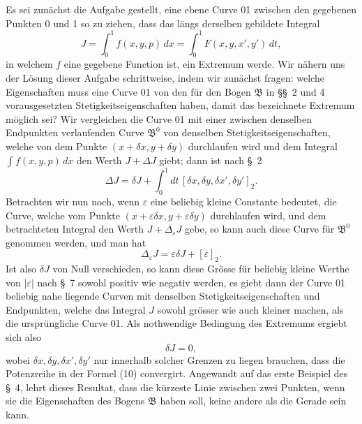 \documentclass[11pt,a4paper,leqno]{article}
\begin{document}
Es sei zunächst die Aufgabe gestellt, eine ebene Curve 01 zwischen den gegebenen Punkten 0 und 1 so zu ziehen, dass das längs derselben gebildete Integral
\[
J=\int_0^1 f(x,y,p)\,dx=\int_0^1 F(x,y,x',y')\,dt,
\]
in welchem $f$ eine gegebene Function ist, ein Extremum werde. Wir nähern uns der Lösung dieser Aufgabe schrittweise, indem wir zunächst fragen: welche Eigenschaften muss eine Curve 01 von den für den Bogen $\mathfrak{B}$ in \S\S~2 und 4 vorausgesetzten Stetigkeitseigenschaften haben, damit das bezeichnete Extremum möglich sei? Wir vergleichen die Curve 01 mit einer zwischen denselben Endpunkten verlaufenden Curve $\mathfrak{B}^0$ von denselben Stetigkeitseigenschaften, welche von dem Punkte $(x+\delta x,y+\delta y)$ durchlaufen wird und dem Integral $\int f(x,y,p)\,dx$ den Werth $J+\Delta J$ giebt; dann ist nach \S~2
\begin{equation}\tag{10}
\Delta J=\delta J+\int_0^1 dt\,[\delta x,\delta y,\delta x',\delta y']_2.
\end{equation}
Betrachten wir nun noch, wenn $\varepsilon$ eine beliebig kleine Constante bedeutet, die Curve, welche vom Punkte $(x+\varepsilon\delta x,y+\varepsilon\delta y)$ durchlaufen wird, und dem betrachteten Integral den Werth $J+\Delta_\varepsilon J$ gebe, so kann auch diese Curve für $\mathfrak{B}^0$ genommen
werden, und man hat
\[
\Delta_\varepsilon J=\varepsilon\delta J+[\varepsilon]_2.
\]
Ist also $\delta J$ von Null verschieden, so kann diese Grösse für beliebig kleine Werthe von $|\varepsilon|$ nach \S~7 sowohl positiv wie negativ werden, es giebt dann der Curve 01 beliebig nahe liegende Curven mit denselben Stetigkeitseigenschaften und Endpunkten, welche das Integral $J$ sowohl grösser wie auch kleiner machen, als die ursprüngliche Curve 01. Als nothwendige Bedingung des Extremums ergiebt sich also
\begin{equation}\tag{11}
\delta J=0,
\end{equation}
wobei $\delta x,\delta y,\delta x',\delta y'$ nur innerhalb solcher Grenzen zu liegen brauchen, dass die Potenzreihe in der Formel (10) convergirt. Angewandt auf das erste Beispiel des \S~4, lehrt dieses Resultat, dass die kürzeste Linie zwischen zwei Punkten, wenn sie die Eigenschaften des Bogens $\mathfrak{B}$ haben soll, keine andere als die Gerade sein kann.
\end{document}
